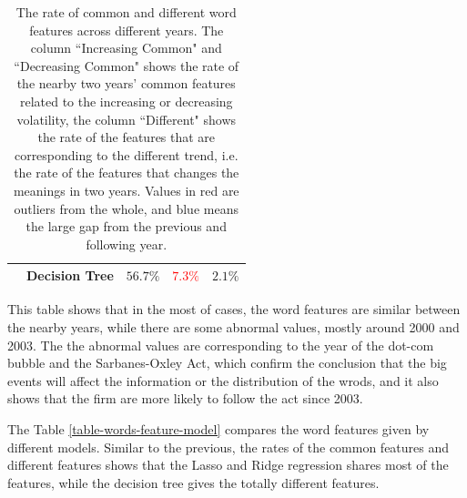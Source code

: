 \documentclass[11pt]{article}
\begin{document}
{\begin{table}[p]
\begin{tabular}{|c|c|c|c|c|}
      \cline{2-5}
                                 & Decision Tree & $56.7\%$                   & \textcolor{red}{$7.3\%$}   & $2.1\%$                     \\
      \hline
    \end{tabular}
    \caption{The rate of common and different word features across different years. The column ``Increasing Common" and ``Decreasing Common" shows the rate of the nearby two years' common features related to the increasing or decreasing volatility, the column ``Different" shows the rate of the features that are corresponding to the different trend, i.e. the rate of the features that changes the meanings in two years. Values in red are outliers from the whole, and blue means the large gap from the previous and following year.}
    \label{table-words-feature-year}
  \end{table}
  \clearpage
}

This table shows that in the most of cases, the word features are similar between the nearby years, while there are some abnormal values, mostly around 2000 and 2003. The the abnormal values are corresponding to the year of the dot-com bubble and the Sarbanes-Oxley Act, which confirm the conclusion that the big events will affect the information or the distribution of the wrods, and it also shows that the firm are more likely to follow the act since 2003.

The Table \ref{table-words-feature-model} compares the word features given by different models. Similar to the previous, the rates of the common features and different features shows that the Lasso and Ridge regression shares most of the features, while the decision tree gives the totally different features.
\end{document}
